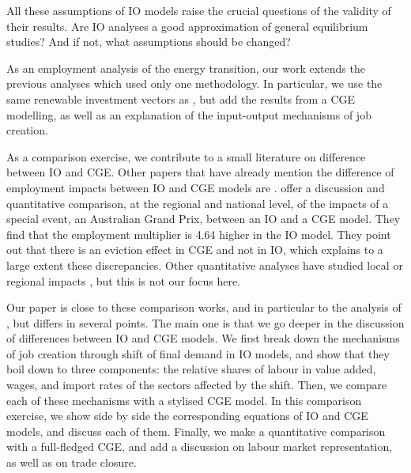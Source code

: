 
All these assumptions of IO models raise the crucial questions of the validity of their results. Are IO analyses a good approximation of general equilibrium studies? And if not, what assumptions should be changed?

As an employment analysis of the energy transition, our work extends the previous analyses which used only one methodology. In particular, we use the same renewable investment vectors as \citet{Garrett2017}, but add the results from a CGE modelling, as well as an explanation of the input-output mechanisms of job creation.

As a comparison exercise, we contribute to a small literature on difference between IO and CGE. 
Other papers that have already mention the difference of employment impacts between IO and CGE models are \citet{Partridge1998, OHara2013}. 
\citet{Dwyer2005} offer a discussion and quantitative comparison, at the regional and national level, of the impacts of a special event, an Australian Grand Prix, between an IO and a CGE model. They find that the employment multiplier is 4.64 higher in the IO model. They point out that there is an eviction effect in CGE and not in IO, which explains to a large extent these discrepancies. Other quantitative analyses have studied local or regional impacts \citep{Siegfried2000}, but this is not our focus here. 

Our paper is close to these comparison works, and in particular to the analysis of \citet{Dwyer2005}, but differs in several points. 
The main one is that we go deeper in the discussion of differences between IO and CGE models. 
We first break down the mechanisms of job creation through shift of final demand in IO models, and show that they boil down to three components: the relative shares of labour in value added, wages, and import rates of the sectors affected by the shift. 
Then, we compare each of these mechanisms with a stylised CGE model. 
In this comparison exercise, we show side by side the corresponding equations of IO and CGE models, and discuss each of them. Finally, we make a quantitative comparison with a full-fledged CGE, and add a discussion on labour market representation, as well as on trade closure.

